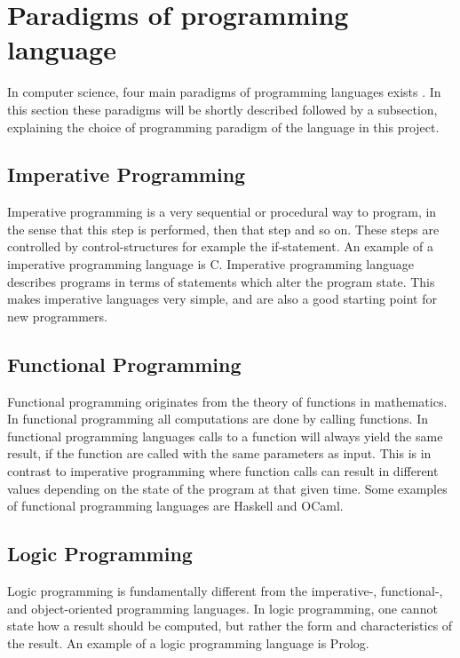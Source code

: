 \section{Paradigms of programming language}
In computer science, four main paradigms of programming languages exists \citep{ProgrammingParadigms}. In this section these paradigms will be shortly described followed by a subsection, explaining the choice of programming paradigm of the language in this project.

\subsection{Imperative Programming}
Imperative programming is a very sequential or procedural way to program, in the sense that this step is performed, then that step and so on. These steps are controlled by control-structures for example the if-statement. An example of a imperative programming language is C. Imperative programming language describes programs in terms of statements which alter the program state. This makes imperative languages very simple, and are also a good starting point for new programmers. 

\subsection{Functional Programming}
Functional programming originates from the theory of functions in mathematics. In functional programming all computations are done by calling functions. In functional programming languages calls to a function will always yield the same result, if the function are called with the same parameters as input. This is in contrast to imperative programming where function calls can result in different values depending on the state of the program at that given time. Some examples of functional programming languages are Haskell and OCaml. 

\subsection{Logic Programming}
Logic programming is fundamentally different from the imperative-, functional-, and object-oriented programming languages. In logic programming, one cannot state how a result should be computed, but rather the form and characteristics of the result. An example of a logic programming language is Prolog. 

